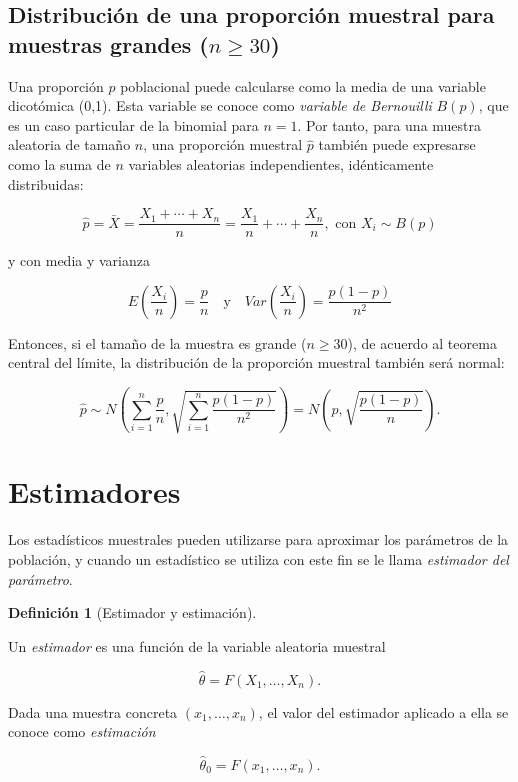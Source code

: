 \documentclass[
  spanish,
  a4paper,
]{scrreport}
\theoremstyle{plain}
\theoremstyle{definition}
\theoremstyle{definition}
\newtheorem{definition}{Definición}[chapter]
\theoremstyle{remark}
\begin{document}
\subsection{\texorpdfstring{Distribución de una proporción muestral para
muestras grandes
(\(n\geq 30\))}{Distribución de una proporción muestral para muestras grandes (n\textbackslash geq 30)}}\label{distribuciuxf3n-de-una-proporciuxf3n-muestral-para-muestras-grandes-ngeq-30}

Una proporción \(p\) poblacional puede calcularse como la media de una
variable dicotómica (0,1). Esta variable se conoce como \emph{variable
de Bernouilli} \(B(p)\), que es un caso particular de la binomial para
\(n=1\). Por tanto, para una muestra aleatoria de tamaño \(n\), una
proporción muestral \(\hat p\) también puede expresarse como la suma de
\(n\) variables aleatorias independientes, idénticamente distribuidas:

\[
\hat p = \bar X = \frac{X_1+\cdots+X_n}{n} = \frac{X_1}{n}+\cdots+\frac{X_n}{n}, \mbox{ con } X_i\sim B(p)
\]

y con media y varianza

\[
E\left(\frac{X_i}{n}\right) =\frac{p}{n} \quad  \mbox{y} \quad Var\left(\frac{X_i}{n}\right) = \frac{p(1-p)}{n^2}
\]

Entonces, si el tamaño de la muestra es grande (\(n\geq 30\)), de
acuerdo al teorema central del límite, la distribución de la proporción
muestral también será normal:

\[
\hat p \sim N\left(\sum_{i=1}^n \frac{p}{n},\sqrt{\sum_{i=1}^n \frac{p(1-p)}{n^2}} \right) = N\left(p,\sqrt{\frac{p(1-p)}{n}} \right).
\]

\section{Estimadores}\label{estimadores}

Los estadísticos muestrales pueden utilizarse para aproximar los
parámetros de la población, y cuando un estadístico se utiliza con este
fin se le llama \emph{estimador del parámetro}.

\begin{definition}[Estimador y
estimación]\protect\hypertarget{def-estimador-estimacion}{}\label{def-estimador-estimacion}

Un \emph{estimador} es una función de la variable aleatoria muestral

\[
\hat \theta = F(X_1,\ldots,X_n).
\]

Dada una muestra concreta \((x_1,\ldots,x_n)\), el valor del estimador
aplicado a ella se conoce como \emph{estimación}

\[
\hat \theta_0 = F(x_1,\ldots,x_n).
\]

\end{definition}
\end{document}
